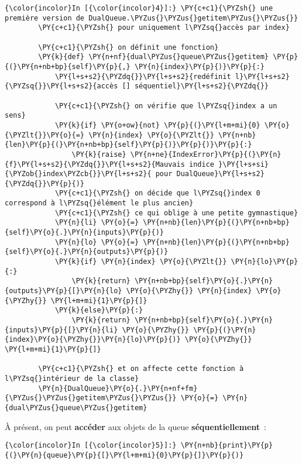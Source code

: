     \begin{Verbatim}[commandchars=\\\{\}]
{\color{incolor}In [{\color{incolor}4}]:} \PY{c+c1}{\PYZsh{} une première version de DualQueue.\PYZus{}\PYZus{}getitem\PYZus{}\PYZus{}}
        \PY{c+c1}{\PYZsh{} pour uniquement l\PYZsq{}accès par index}
        
        \PY{c+c1}{\PYZsh{} on définit une fonction}
        \PY{k}{def} \PY{n+nf}{dual\PYZus{}queue\PYZus{}getitem} \PY{p}{(}\PY{n+nb+bp}{self}\PY{p}{,} \PY{n}{index}\PY{p}{)}\PY{p}{:}
            \PY{l+s+s2}{\PYZdq{}}\PY{l+s+s2}{redéfinit l}\PY{l+s+s2}{\PYZsq{}}\PY{l+s+s2}{accès [] séquentiel}\PY{l+s+s2}{\PYZdq{}}
        
            \PY{c+c1}{\PYZsh{} on vérifie que l\PYZsq{}index a un sens}
            \PY{k}{if} \PY{o+ow}{not} \PY{p}{(}\PY{l+m+mi}{0} \PY{o}{\PYZlt{}}\PY{o}{=} \PY{n}{index} \PY{o}{\PYZlt{}} \PY{n+nb}{len}\PY{p}{(}\PY{n+nb+bp}{self}\PY{p}{)}\PY{p}{)}\PY{p}{:}
                \PY{k}{raise} \PY{n+ne}{IndexError}\PY{p}{(}\PY{n}{f}\PY{l+s+s2}{\PYZdq{}}\PY{l+s+s2}{Mauvais indice }\PY{l+s+si}{\PYZob{}index\PYZcb{}}\PY{l+s+s2}{ pour DualQueue}\PY{l+s+s2}{\PYZdq{}}\PY{p}{)}
            \PY{c+c1}{\PYZsh{} on décide que l\PYZsq{}index 0 correspond à l\PYZsq{}élément le plus ancien}
            \PY{c+c1}{\PYZsh{} ce qui oblige à une petite gymnastique}
            \PY{n}{li} \PY{o}{=} \PY{n+nb}{len}\PY{p}{(}\PY{n+nb+bp}{self}\PY{o}{.}\PY{n}{inputs}\PY{p}{)}
            \PY{n}{lo} \PY{o}{=} \PY{n+nb}{len}\PY{p}{(}\PY{n+nb+bp}{self}\PY{o}{.}\PY{n}{outputs}\PY{p}{)}
            \PY{k}{if} \PY{n}{index} \PY{o}{\PYZlt{}} \PY{n}{lo}\PY{p}{:}
                \PY{k}{return} \PY{n+nb+bp}{self}\PY{o}{.}\PY{n}{outputs}\PY{p}{[}\PY{n}{lo} \PY{o}{\PYZhy{}} \PY{n}{index} \PY{o}{\PYZhy{}} \PY{l+m+mi}{1}\PY{p}{]}
            \PY{k}{else}\PY{p}{:}
                \PY{k}{return} \PY{n+nb+bp}{self}\PY{o}{.}\PY{n}{inputs}\PY{p}{[}\PY{n}{li} \PY{o}{\PYZhy{}} \PY{p}{(}\PY{n}{index}\PY{o}{\PYZhy{}}\PY{n}{lo}\PY{p}{)} \PY{o}{\PYZhy{}} \PY{l+m+mi}{1}\PY{p}{]}
        
        \PY{c+c1}{\PYZsh{} et on affecte cette fonction à l\PYZsq{}intérieur de la classe}
        \PY{n}{DualQueue}\PY{o}{.}\PY{n+nf+fm}{\PYZus{}\PYZus{}getitem\PYZus{}\PYZus{}} \PY{o}{=} \PY{n}{dual\PYZus{}queue\PYZus{}getitem}
\end{Verbatim}


    À présent, on peut \textbf{accéder} aux objets de la queue
\textbf{séquentiellement}~:

    \begin{Verbatim}[commandchars=\\\{\}]
{\color{incolor}In [{\color{incolor}5}]:} \PY{n+nb}{print}\PY{p}{(}\PY{n}{queue}\PY{p}{[}\PY{l+m+mi}{0}\PY{p}{]}\PY{p}{)}
\end{Verbatim}


